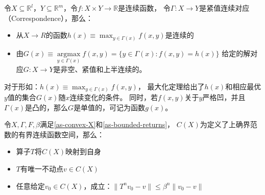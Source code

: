 \begin{theorem}    \label{th-max-th}
    令$X\subseteq\mathbb{R}^l$，$Y\subseteq\mathbb{R}^m$，令$f: X\times Y \rightarrow \mathbb{R}$是连续函数，
    令$\Gamma: X\rightarrow Y$是紧值连续对应（Correspondence），那么：
    \begin{itemize}
        \item 从$X\rightarrow R$的函数$h\left(x\right)\equiv\max _{y\in\Gamma\left(x\right)}f\left(x,y\right)$是连续的
        \item 由$G(x)\equiv\underset{y\in\Gamma(x)}{\operatorname{argmax}}f(x, y)=\{y\in\Gamma(x): f(x, y)=h(x)\}$
        给定的解对应$G: X\rightarrow Y$是非空、紧值和上半连续的。
    \end{itemize}
\end{theorem}

对于形如：$h\left(x\right)\equiv \max_{y\in\Gamma\left(x\right)}f\left(x,y\right)$，
最大化定理给出了$h\left(x\right)$和相应最优$y$值的集合$G\left(x\right)$随$x$连续变化的条件。
同时，若$f\left(x,y\right)$关于$y$严格凹，并且$\Gamma\left(x\right)$是凸的，那么$G$是单值的，可记为函数$g\left(x\right)$。

\begin{theorem}[$FE$问题解的存在及唯一性] \label{th-fe-solution-exist}
    令$X, \Gamma, F, \beta$满足\cref{as-convex-X}和\cref{as-bounded-returns}，
    $C\left(X\right)$为定义了上确界范数的有界连续函数空间，那么：
    \begin{itemize}
        \item 算子$T$将$C\left(X\right)$映射到自身
        \item $T$有唯一不动点$v\in C\left(X\right)$
        \item 任意给定$v_0\in C\left(X\right)$，成立：$\|T^nv_0-v\|\leq \beta^n \|v_0-v\|$
    \end{itemize}
\end{theorem}

